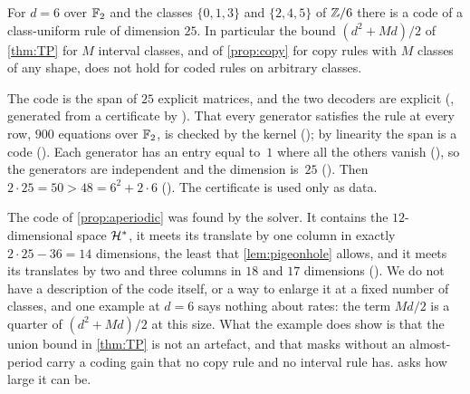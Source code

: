\begin{proposition}\label{prop:aperiodic}
For $d=6$ over $\mathbb{F}_2$ and the classes $\{0,1,3\}$ and $\{2,4,5\}$ of $\mathbb{Z}/6$ there is a code of a class-uniform rule of
dimension $25$. In particular the bound $(d^2+Md)/2$ of \cref{thm:TP} for $M$ interval classes, and of \cref{prop:copy}
for copy rules with $M$ classes of any shape, does not hold for coded rules on arbitrary classes.
\end{proposition}

\begin{outline}
The code is the span of $25$ explicit matrices, and the two decoders are explicit
(, generated from a certificate by ). That
every generator satisfies the rule at every row, $900$ equations over $\mathbb{F}_2$, is checked by the kernel
(); by linearity the span is a code (). Each generator has
an entry equal to~$1$ where all the others vanish (), so the generators are independent and
the dimension is~$25$ (). Then $2\cdot25=50>48=6^2+2\cdot6$
(). The certificate is used only as data.
\end{outline}

The code of \cref{prop:aperiodic} was found by the solver. It contains the $12$-dimensional space $\mathcal{H}^*$, it meets its translate by one column in exactly $2\cdot25-36=14$
dimensions, the least that \cref{lem:pigeonhole} allows, and it meets its translates by two and three columns in $18$
and $17$ dimensions (). We do not have a description of the code itself, or a way to
enlarge it at a fixed number of classes, and one example at $d=6$ says nothing about
rates: the term $Md/2$ is a quarter of $(d^2+Md)/2$ at this size. What the example does show is that the union bound in
\cref{thm:TP} is not an artefact, and that masks without an almost-period carry a coding gain that no copy rule and no
interval rule has.  asks how large it can be.

